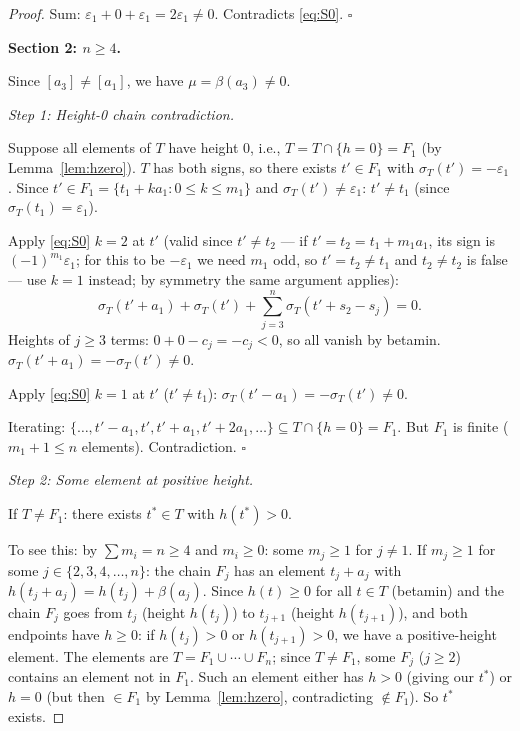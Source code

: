 \begin{proof}
Sum: $\varepsilon_1 + 0 + \varepsilon_1 = 2\varepsilon_1 \neq 0$. Contradicts \eqref{eq:S0}. $\square$

\medskip
\noindent\textbf{Section 2: $n \geq 4$.}

Since $[a_3] \neq [a_1]$, we have $\mu = \beta(a_3) \neq 0$.

\medskip
\noindent\textit{Step 1: Height-0 chain contradiction.}

Suppose all elements of $T$ have height $0$, i.e., $T = T \cap \{h=0\} = F_1$
(by Lemma~\ref{lem:hzero}).
$T$ has both signs, so there exists $t' \in F_1$ with $\sigma_T(t') = -\varepsilon_1$.
Since $t' \in F_1 = \{t_1 + k a_1 : 0 \leq k \leq m_1\}$ and $\sigma_T(t') \neq \varepsilon_1$:
$t' \neq t_1$ (since $\sigma_T(t_1) = \varepsilon_1$).

Apply \eqref{eq:S0} $k=2$ at $t'$ (valid since $t' \neq t_2$ — if $t' = t_2 = t_1+m_1 a_1$,
its sign is $(-1)^{m_1}\varepsilon_1$; for this to be $-\varepsilon_1$ we need $m_1$ odd, so
$t' = t_2 \neq t_1$ and $t_2 \neq t_2$ is false — use $k=1$ instead; by symmetry the same
argument applies):
\[
  \sigma_T(t' + a_1) + \sigma_T(t') + \sum_{j=3}^n \sigma_T(t' + s_2 - s_j) = 0.
\]
Heights of $j \geq 3$ terms: $0 + 0 - c_j = -c_j < 0$, so all vanish by betamin.
$\sigma_T(t' + a_1) = -\sigma_T(t') \neq 0$.

Apply \eqref{eq:S0} $k=1$ at $t'$ ($t' \neq t_1$):
$\sigma_T(t'-a_1) = -\sigma_T(t') \neq 0$.

Iterating: $\{\ldots, t'-a_1, t', t'+a_1, t'+2a_1, \ldots\} \subseteq T \cap \{h=0\} = F_1$.
But $F_1$ is finite ($m_1 + 1 \leq n$ elements). Contradiction. $\square$

\medskip
\noindent\textit{Step 2: Some element at positive height.}

If $T \neq F_1$: there exists $t^* \in T$ with $h(t^*) > 0$.

To see this: by $\sum m_i = n \geq 4$ and $m_i \geq 0$: some $m_j \geq 1$ for $j \neq 1$.
If $m_j \geq 1$ for some $j \in \{2, 3, 4, \ldots, n\}$: the chain $F_j$ has an element
$t_j + a_j$ with $h(t_j + a_j) = h(t_j) + \beta(a_j)$.
Since $h(t) \geq 0$ for all $t \in T$ (betamin) and the chain $F_j$ goes from $t_j$
(height $h(t_j)$) to $t_{j+1}$ (height $h(t_{j+1})$), and both endpoints have $h \geq 0$:
if $h(t_j) > 0$ or $h(t_{j+1}) > 0$, we have a positive-height element.
The elements are $T = F_1 \cup \cdots \cup F_n$; since $T \neq F_1$, some $F_j$ ($j \geq 2$)
contains an element not in $F_1$.  Such an element either has $h > 0$ (giving our $t^*$)
or $h = 0$ (but then $\in F_1$ by Lemma~\ref{lem:hzero}, contradicting $\notin F_1$).
So $t^*$ exists.


\end{proof}
